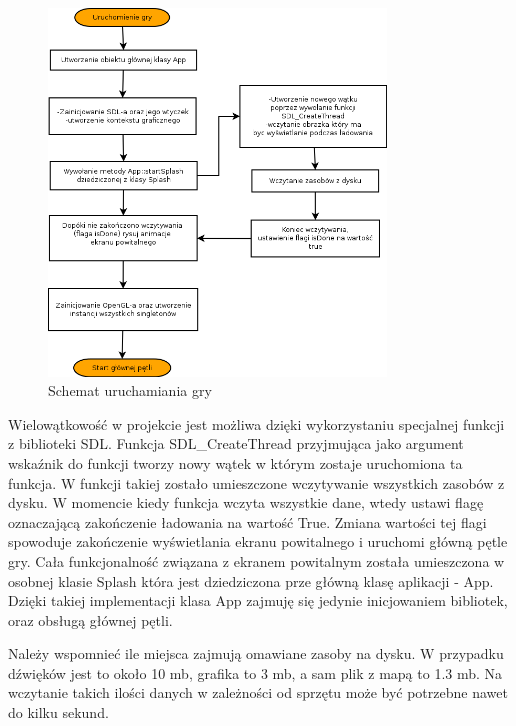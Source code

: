 \begin{figure}[h]
    \centering
    \includegraphics[width=0.8\textwidth,natwidth=800,natheight=152]{./Pictures/splash.png}
    \caption{Schemat uruchamiania gry}
\end{figure}

Wielowątkowość w projekcie jest możliwa dzięki wykorzystaniu specjalnej funkcji z biblioteki SDL. Funkcja SDL\_CreateThread przyjmująca jako argument wskaźnik do funkcji tworzy nowy wątek w którym zostaje uruchomiona ta funkcja. W funkcji takiej zostało umieszczone wczytywanie wszystkich zasobów z dysku. W momencie kiedy funkcja wczyta wszystkie dane, wtedy ustawi flagę oznaczającą zakończenie ładowania na wartość True. Zmiana wartości tej flagi spowoduje zakończenie wyświetlania ekranu powitalnego i uruchomi główną pętle gry. Cała funkcjonalność związana z ekranem powitalnym została umieszczona w osobnej klasie Splash która jest dziedziczona prze główną klasę aplikacji - App. Dzięki takiej implementacji klasa App zajmuję się jedynie inicjowaniem bibliotek, oraz obsługą głównej pętli. 

Należy wspomnieć ile miejsca zajmują omawiane zasoby na dysku. W przypadku  dźwięków jest to około 10 mb, grafika to 3 mb, a sam plik z mapą to 1.3 mb. Na wczytanie takich ilości danych w zależności od sprzętu może być potrzebne nawet do kilku sekund.




